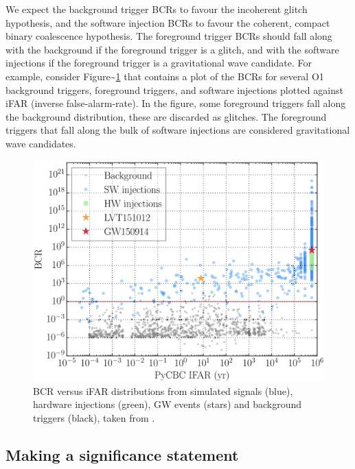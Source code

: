 \documentclass[%
 reprint,
 amsmath,amssymb,
 aps,
]{revtex4-2}
\begin{document}
We expect the background trigger BCRs to favour the incoherent glitch hypothesis, and the software injection BCRs to
favour the coherent, compact binary coalescence hypothesis. The foreground trigger BCRs should fall along with the
background if the foreground trigger is a glitch, and with the software injections if the foreground trigger is a
gravitational wave candidate. For example, consider Figure\textasciitilde\ref{fig:bcrIfar} that contains a plot of the BCRs for
several O1 background triggers, foreground triggers, and software injections plotted against iFAR (inverse
false-alarm-rate). In the figure, some foreground triggers fall along the background distribution, these are discarded
as glitches. The foreground triggers that fall along the bulk of software injections are considered gravitational wave
candidates.



\begin{figure}[!h]

{\centering \includegraphics[width=0.75\linewidth]{images/bcr_ifar} 

}

\caption[BCR vs iFAR for O1]{BCR versus iFAR distributions from simulated signals (blue), hardware injections (green), GW events (stars) and background triggers (black), taken from \citet{bcr_paper}.}\label{fig:bcrIfar}
\end{figure}

\hypertarget{making-a-significance-statement}{%
\subsection{Making a significance statement}\label{making-a-significance-statement}}
\end{document}
